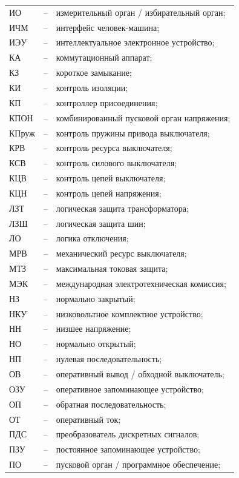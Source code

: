 \begin{longtable}{>{\raggedright\arraybackslash}m{2cm}>{\raggedright\arraybackslash}m{0.5cm}>{\raggedright\arraybackslash}m{20cm}}
ИО & -- & измерительный орган / избирательный орган; \\
ИЧМ & -- & интерфейс человек-машина; \\
ИЭУ & -- & интеллектуальное электронное устройство; \\
КА & -- & коммутационный аппарат; \\
КЗ & -- & короткое замыкание; \\
КИ & -- & контроль изоляции; \\
КП & -- & контроллер присоединения; \\
КПОН & -- & комбинированный пусковой орган напряжения; \\
КПруж & -- & контроль пружины привода выключателя; \\
КРВ & -- & контроль ресурса выключателя; \\
КСВ & -- & контроль силового выключателя; \\
КЦВ & -- & контроль цепей выключателя; \\
КЦН & -- & контроль цепей напряжения; \\
ЛЗТ & -- & логическая защита трансформатора; \\
ЛЗШ & -- & логическая защита шин; \\
ЛО & -- & логика отключения; \\
МРВ & -- & механический ресурс выключателя; \\
МТЗ & -- & максимальная токовая защита; \\
МЭК & -- & международная электротехническая комиссия; \\
НЗ & -- & нормально закрытый; \\
НКУ & -- & низковольтное комплектное устройство; \\
НН & -- & низшее напряжение; \\
НО & -- & нормально открытый; \\
НП & -- & нулевая последовательность; \\
ОВ & -- & оперативный вывод / обходной выключатель; \\
ОЗУ & -- & оперативное запоминающее устройство; \\
ОП & -- & обратная последовательность; \\
ОТ & -- & оперативный ток; \\
ПДС & -- & преобразователь дискретных сигналов; \\
ПЗУ & -- & постоянное запоминающее устройство; \\
ПО & -- & пусковой орган / программное обеспечение; \\

\end{longtable}
